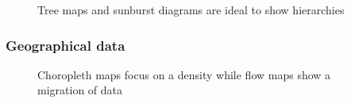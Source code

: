 \documentclass{article}
\begin{document}
\begin{figure}
  \centering
    \qquad
    \caption{Tree maps and sunburst diagrams are ideal to show hierarchies}%
    \label{fig:concept:chart-types:hierarchies}
\end{figure}

\subsubsection{Geographical data}

\begin{figure}
  \centering
    \qquad
    \caption{Choropleth maps focus on a density while flow maps show a migration of data}%
    \label{fig:concept:chart-types:geographical}
\end{figure}
\end{document}
